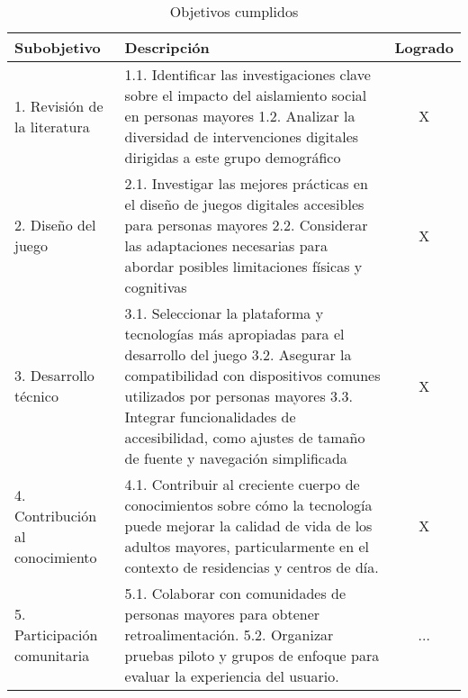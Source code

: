 \begin{table}[H]
	\centering
	\begin{tabular}{| p{3.5cm} | p{9.6cm} | c |}
		\hline
		\rowcolor{lightgray}
		\textbf{Subobjetivo} & \textbf{Descripción} & \textbf{Logrado}\\
		\hline
		1. Revisión de la literatura & 
		1.1. Identificar las investigaciones clave sobre el impacto del aislamiento social en personas mayores \newline
		\vspace{0.2cm}
		1.2. Analizar la diversidad de intervenciones digitales dirigidas a este grupo demográfico \vspace{0.2cm}
		& X \\
		\hline
		2. Diseño del juego &
		2.1. Investigar las mejores prácticas en el diseño de juegos digitales accesibles para personas mayores \newline
		\vspace{0.2cm}
		2.2. Considerar las adaptaciones necesarias para abordar posibles limitaciones físicas y cognitivas
		\vspace{0.2cm} & X \\
		\hline
		3. Desarrollo técnico & 
		3.1. Seleccionar la plataforma y tecnologías más apropiadas para el desarrollo del juego \newline
		\vspace{0.2cm}
		3.2. Asegurar la compatibilidad con dispositivos comunes utilizados por personas mayores \newline
		\vspace{0.2cm}
		3.3. Integrar funcionalidades de accesibilidad, como ajustes de tamaño de fuente y navegación simplificada \vspace{0.2cm} & X \\
		\hline
		4. Contribución al conocimiento & 
		4.1. Contribuir al creciente cuerpo de conocimientos sobre cómo la tecnología puede mejorar la calidad de vida de los adultos mayores, particularmente en el contexto de residencias y centros de día. 
		\vspace{0.2cm} & X \\
		\hline
		5. Participación comunitaria & 
		5.1. Colaborar con comunidades de personas mayores para obtener retroalimentación. \newline
		\vspace{0.2cm}
		5.2. Organizar pruebas piloto y grupos de enfoque para evaluar la experiencia del usuario. \vspace{0.2cm} & ... \\
		\hline
	\end{tabular}
	\caption{Objetivos cumplidos}
	\label{tab:objetivos-cumplidos}
\end{table}


